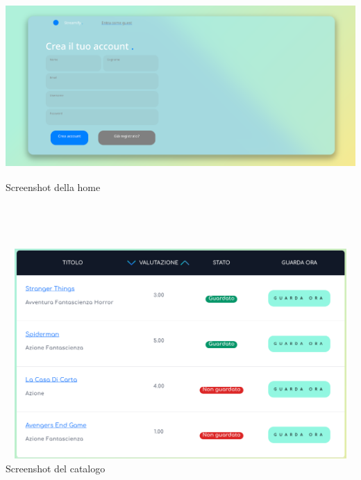 \documentclass[12pt]{article}
\begin{document}
	\begin{center}
		\centering \includegraphics[width=15cm, height=7cm]{Immagini/Home_screen.png} \\
		\centering Screenshot della home ~\\ ~\\ ~\\ ~\\ ~\\
		
		\centering \includegraphics[width=15cm, height=8cm]{Immagini/Catalogo_screen.png} \\
		\centering Screenshot del catalogo
		

\end{center}
\end{document}
